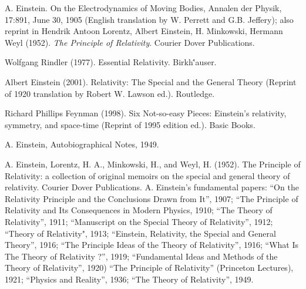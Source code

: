 \documentclass[12pt]{article}
\begin{document}
\begin{thebibliography}{99}

A. Einstein. On the Electrodynamics of Moving Bodies, Annalen der Physik, 17:891, June 30, 1905 (English translation by W. Perrett and G.B. Jeffery); also reprint in Hendrik Antoon Lorentz, Albert Einstein, H. Minkowski, Hermann Weyl (1952). \emph{The Principle of Relativity}. Courier Dover Publications. 

Wolfgang Rindler (1977). Essential Relativity. Birkh\''auser. 
 
Albert Einstein (2001). Relativity: The Special and the General Theory (Reprint of 1920 translation by Robert W. Lawson ed.). Routledge. 

Richard Phillips Feynman (1998). Six Not-so-easy Pieces: Einstein's relativity, symmetry, and space-time (Reprint of 1995 edition ed.). Basic Books.

A. Einstein, Autobiographical Notes, 1949.
 
A. Einstein, Lorentz, H. A., Minkowski, H., and Weyl, H. (1952). The Principle of Relativity: a collection of original memoirs on the special and general theory of relativity. Courier Dover Publications.
A. Einstein's fundamental papers:
``On the Relativity Principle and the Conclusions Drawn from It'', 1907; 
``The Principle of Relativity and Its Consequences in Modern Physics, 1910; 
``The Theory of Relativity'', 1911; 
``Manuscript on the Special Theory of Relativity'', 1912; 
``Theory of Relativity", 1913; 
``Einstein, Relativity, the Special and General Theory'', 1916; 
``The Principle Ideas of the Theory of Relativity'', 1916; 
``What Is The Theory of Relativity ?'', 1919; 
``Fundamental Ideas and Methods of the Theory of Relativity'', 1920) 
``The Principle of Relativity'' (Princeton Lectures), 1921;
``Physics and Reality'', 1936; 
``The Theory of Relativity'', 1949. 

\end{thebibliography}
\end{document}
